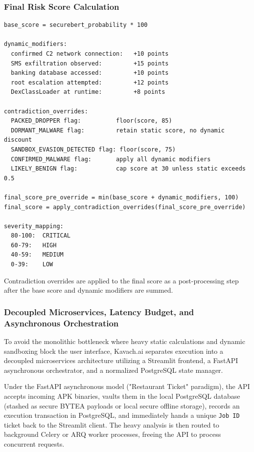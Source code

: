 \documentclass[10pt,a4paper]{article}
\begin{document}
\subsubsection*{Final Risk Score Calculation}
\begin{rulebox}
\begin{verbatim}
base_score = securebert_probability * 100

dynamic_modifiers:
  confirmed C2 network connection:   +10 points
  SMS exfiltration observed:         +15 points
  banking database accessed:         +10 points
  root escalation attempted:         +12 points
  DexClassLoader at runtime:         +8 points

contradiction_overrides:
  PACKED_DROPPER flag:          floor(score, 85)
  DORMANT_MALWARE flag:         retain static score, no dynamic discount
  SANDBOX_EVASION_DETECTED flag: floor(score, 75)
  CONFIRMED_MALWARE flag:       apply all dynamic modifiers
  LIKELY_BENIGN flag:           cap score at 30 unless static exceeds 0.5

final_score_pre_override = min(base_score + dynamic_modifiers, 100)
final_score = apply_contradiction_overrides(final_score_pre_override)

severity_mapping:
  80-100:  CRITICAL
  60-79:   HIGH
  40-59:   MEDIUM
  0-39:    LOW
\end{verbatim}
\end{rulebox}

Contradiction overrides are applied to the final score as a post-processing step after the base score and dynamic modifiers are summed.

\subsubsection*{Decoupled Microservices, Latency Budget, and Asynchronous Orchestration}

To avoid the monolithic bottleneck where heavy static calculations and dynamic sandboxing block the user interface, Kavach.ai separates execution into a decoupled microservices architecture utilizing a Streamlit frontend, a FastAPI asynchronous orchestrator, and a normalized PostgreSQL state manager.

Under the FastAPI asynchronous model ("Restaurant Ticket" paradigm), the API accepts incoming APK binaries, vaults them in the local PostgreSQL database (stashed as secure BYTEA payloads or local secure offline storage), records an execution transaction in PostgreSQL, and immediately hands a unique \texttt{Job ID} ticket back to the Streamlit client. The heavy analysis is then routed to background Celery or ARQ worker processes, freeing the API to process concurrent requests.
\end{document}
